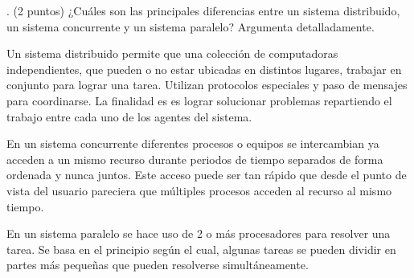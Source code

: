 . (2 puntos) ¿Cuáles son las principales diferencias entre
un sistema distribuido, un sistema concurrente y un sistema
paralelo? Argumenta detalladamente. 

Un sistema distribuido permite que una colección de computadoras independientes, que pueden o no estar ubicadas en distintos lugares, trabajar en conjunto para lograr una tarea. Utilizan protocolos especiales y paso de mensajes para coordinarse. La finalidad es es lograr solucionar problemas repartiendo el trabajo entre cada uno de los agentes del sistema.

En un sistema concurrente diferentes procesos o equipos se intercambian ya acceden a un mismo recurso durante periodos de tiempo separados de forma ordenada y nunca juntos. Este acceso puede ser tan rápido que desde el punto de vista del usuario pareciera que múltiples procesos acceden al recurso al mismo tiempo. 

En un sistema paralelo se hace uso de 2 o más procesadores para resolver una tarea. Se basa en el principio según el cual, algunas tareas se pueden dividir en partes más pequeñas que pueden resolverse simultáneamente.
